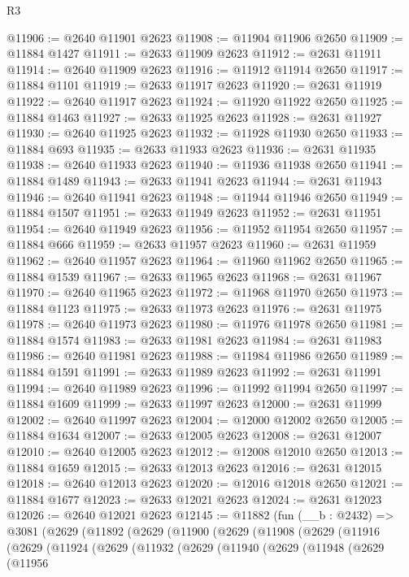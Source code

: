 \begin{lexlean}{R3}
\begin{coremodule}
@11906 := @2640 @11901 @2623
@11908 := @11904 @11906 @2650
@11909 := @11884 @1427
@11911 := @2633 @11909 @2623
@11912 := @2631 @11911
@11914 := @2640 @11909 @2623
@11916 := @11912 @11914 @2650
@11917 := @11884 @1101
@11919 := @2633 @11917 @2623
@11920 := @2631 @11919
@11922 := @2640 @11917 @2623
@11924 := @11920 @11922 @2650
@11925 := @11884 @1463
@11927 := @2633 @11925 @2623
@11928 := @2631 @11927
@11930 := @2640 @11925 @2623
@11932 := @11928 @11930 @2650
@11933 := @11884 @693
@11935 := @2633 @11933 @2623
@11936 := @2631 @11935
@11938 := @2640 @11933 @2623
@11940 := @11936 @11938 @2650
@11941 := @11884 @1489
@11943 := @2633 @11941 @2623
@11944 := @2631 @11943
@11946 := @2640 @11941 @2623
@11948 := @11944 @11946 @2650
@11949 := @11884 @1507
@11951 := @2633 @11949 @2623
@11952 := @2631 @11951
@11954 := @2640 @11949 @2623
@11956 := @11952 @11954 @2650
@11957 := @11884 @666
@11959 := @2633 @11957 @2623
@11960 := @2631 @11959
@11962 := @2640 @11957 @2623
@11964 := @11960 @11962 @2650
@11965 := @11884 @1539
@11967 := @2633 @11965 @2623
@11968 := @2631 @11967
@11970 := @2640 @11965 @2623
@11972 := @11968 @11970 @2650
@11973 := @11884 @1123
@11975 := @2633 @11973 @2623
@11976 := @2631 @11975
@11978 := @2640 @11973 @2623
@11980 := @11976 @11978 @2650
@11981 := @11884 @1574
@11983 := @2633 @11981 @2623
@11984 := @2631 @11983
@11986 := @2640 @11981 @2623
@11988 := @11984 @11986 @2650
@11989 := @11884 @1591
@11991 := @2633 @11989 @2623
@11992 := @2631 @11991
@11994 := @2640 @11989 @2623
@11996 := @11992 @11994 @2650
@11997 := @11884 @1609
@11999 := @2633 @11997 @2623
@12000 := @2631 @11999
@12002 := @2640 @11997 @2623
@12004 := @12000 @12002 @2650
@12005 := @11884 @1634
@12007 := @2633 @12005 @2623
@12008 := @2631 @12007
@12010 := @2640 @12005 @2623
@12012 := @12008 @12010 @2650
@12013 := @11884 @1659
@12015 := @2633 @12013 @2623
@12016 := @2631 @12015
@12018 := @2640 @12013 @2623
@12020 := @12016 @12018 @2650
@12021 := @11884 @1677
@12023 := @2633 @12021 @2623
@12024 := @2631 @12023
@12026 := @2640 @12021 @2623
@12145 := @11882
    (fun (__b : @2432) =>
    @3081
      (@2629
        (@11892
          (@2629
            (@11900
              (@2629
                (@11908
                  (@2629
                    (@11916
                      (@2629
                        (@11924
                          (@2629
                            (@11932
                              (@2629
                                (@11940
                                  (@2629
                                    (@11948
                                      (@2629
                                        (@11956

\end{coremodule}
\end{lexlean}
